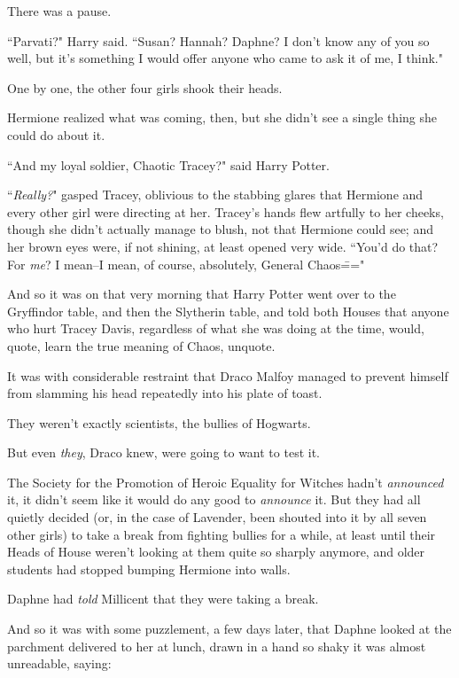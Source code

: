 There was a pause.

``Parvati?" Harry said. ``Susan? Hannah? Daphne? I don't know any of you so well, but it's something I would offer anyone who came to ask it of me, I think."

One by one, the other four girls shook their heads.

Hermione realized what was coming, then, but she didn't see a single thing she could do about it.

``And my loyal soldier, Chaotic Tracey?" said Harry Potter.

``\emph{Really?}" gasped Tracey, oblivious to the stabbing glares that Hermione and every other girl were directing at her. Tracey's hands flew artfully to her cheeks, though she didn't actually manage to blush, not that Hermione could see; and her brown eyes were, if not shining, at least opened very wide. ``You'd do that? For \emph{me}? I mean\---I mean, of course, absolutely, General Chaos\==="

\later

And so it was on that very morning that Harry Potter went over to the Gryffindor table, and then the Slytherin table, and told both Houses that anyone who hurt Tracey Davis, regardless of what she was doing at the time, would, quote, learn the true meaning of Chaos, unquote.

It was with considerable restraint that Draco Malfoy managed to prevent himself from slamming his head repeatedly into his plate of toast.

They weren't exactly scientists, the bullies of Hogwarts.

But even \emph{they}, Draco knew, were going to want to test it.

\later

The Society for the Promotion of Heroic Equality for Witches hadn't \emph{announced} it, it didn't seem like it would do any good to \emph{announce} it. But they had all quietly decided (or, in the case of Lavender, been shouted into it by all seven other girls) to take a break from fighting bullies for a while, at least until their Heads of House weren't looking at them quite so sharply anymore, and older students had stopped bumping Hermione into walls.

Daphne had \emph{told} Millicent that they were taking a break.

And so it was with some puzzlement, a few days later, that Daphne looked at the parchment delivered to her at lunch, drawn in a hand so shaky it was almost unreadable, saying:

